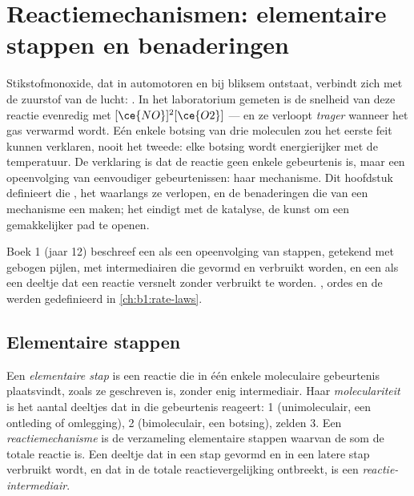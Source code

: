 \chapter{Reactiemechanismen: elementaire stappen en benaderingen}\label{ch:b1:elementary-steps}

Stikstofmonoxide, dat in automotoren en bij bliksem ontstaat, verbindt
zich met de zuurstof van de lucht: . In het
laboratorium gemeten is de snelheid van deze reactie evenredig met
$[\ce{NO}]^2[\ce{O2}]$ --- en ze verloopt \emph{trager} wanneer het gas
verwarmd wordt. Eén enkele botsing van drie moleculen zou het eerste feit
kunnen verklaren, nooit het tweede: elke botsing wordt energierijker met
de temperatuur. De verklaring is dat de reactie geen enkele gebeurtenis
is, maar een opeenvolging van eenvoudiger gebeurtenissen: haar
mechanisme. Dit hoofdstuk definieert die , het
 waarlangs ze verlopen, en de benaderingen die van een
mechanisme een  maken; het eindigt met de katalyse, de kunst
om een gemakkelijker pad te openen.

\begin{recall}
Boek 1 (jaar 12) beschreef een  als een opeenvolging van
stappen, getekend met gebogen pijlen, met intermediairen die gevormd en
verbruikt worden, en een  als een deeltje dat een reactie
versnelt zonder verbruikt te worden. , ordes en de  werden gedefinieerd in \cref{ch:b1:rate-laws}.
\end{recall}

\section{Elementaire stappen}

\begin{definition}\label{def:b1:elementary-steps:elementary-step}
Een \emph{elementaire stap} is een reactie die in
één enkele moleculaire gebeurtenis plaatsvindt, zoals ze geschreven is,
zonder enig intermediair. Haar \emph{moleculariteit}
is het aantal deeltjes dat in die gebeurtenis reageert: 1
(unimoleculair, een ontleding of omlegging), 2 (bimoleculair, een
botsing), zelden 3. Een
\emph{reactiemechanisme} is de verzameling
elementaire stappen waarvan de som de totale reactie is. Een deeltje dat
in een stap gevormd en in een latere stap verbruikt wordt, en dat in de
totale reactievergelijking ontbreekt, is een
\emph{reactie-intermediair}.
\end{definition}

